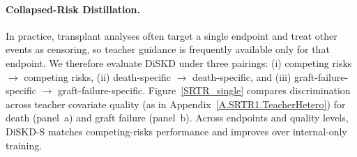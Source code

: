 \documentclass{article}
\theoremstyle{plain}
\theoremstyle{definition}
\theoremstyle{remark}
\begin{document}





\paragraph{Collapsed-Risk Distillation.}
In practice, transplant analyses often target a single endpoint and treat other events as censoring, so teacher guidance is frequently available only for that endpoint.
We therefore evaluate DiSKD under three pairings:
(i) competing risks $\rightarrow$ competing risks,
(ii) death-specific $\rightarrow$ death-specific, and
(iii) graft-failure-specific $\rightarrow$ graft-failure-specific.
Figure~\ref{SRTR_single} compares discrimination across teacher covariate quality (as in Appendix~\ref{A.SRTR1.TeacherHetero}) for death (panel~a) and graft failure (panel~b). Across endpoints and quality levels, DiSKD-S matches competing-risks performance and improves over internal-only training. %
\end{document}
